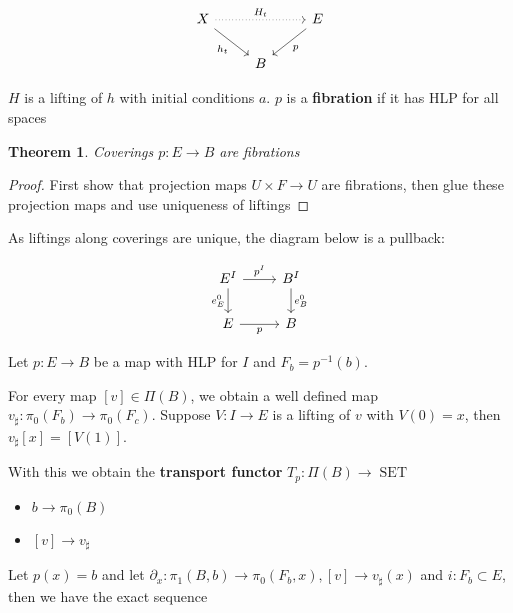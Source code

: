 \documentclass[12pt]{article}
\newtheorem*{thm*}{Theorem}
\DeclareMathOperator{\SET}{SET}
\begin{document}
\[\begin{tikzcd}
	X && E \\
	& B
	\arrow["{H_t}", dotted, from=1-1, to=1-3]
	\arrow["{h_t}"', from=1-1, to=2-2]
	\arrow["p", from=1-3, to=2-2]
\end{tikzcd}\]

$H$ is a lifting of $h$ with initial conditions $a$. $p$ is a \textbf{fibration} if it has HLP for all spaces

\begin{thm*}
    Coverings $p:E\to B$ are fibrations
\end{thm*}

\begin{proof}
    First show that projection maps $U\times F\to U$ are fibrations, then glue these projection maps and use uniqueness of liftings
\end{proof}

As liftings along coverings are unique, the diagram below is a pullback:

\[\begin{tikzcd} {E^I} & {B^I} \\ E & B
	\arrow["p"', from=2-1, to=2-2]
	\arrow["{p^I}", from=1-1, to=1-2]
	\arrow["{e_B^0}", from=1-2, to=2-2]
	\arrow["{e_E^0}"', from=1-1, to=2-1]
\end{tikzcd}\]

Let $p:E\to B$ be a map with HLP for $I$ and $F_b=p^{-1}(b)$.

For every map $[v]\in\Pi(B)$, we obtain a well defined map $v_\sharp:\pi_0\left(F_b\right)\to\pi_0\left(F_c\right)$. Suppose $V:I\to E$ is a lifting of $v$ with $V(0)=x$, then $v_\sharp[x]=\left[V(1)\right]$.

With this we obtain the \textbf{transport functor} $T_p:\Pi(B)\to\SET$
\begin{itemize}
    \item $b\to\pi_0(B)$
    \item $[v]\to v_\sharp$
\end{itemize}

Let $p(x)=b$ and let $\partial_x:\pi_1\left(B,b\right)\to\pi_0\left(F_b,x\right),[v]\to v_\sharp(x)$ and $i:F_b\subset E$, then we have the exact sequence

\begin{center}
\end{center}
\end{document}
